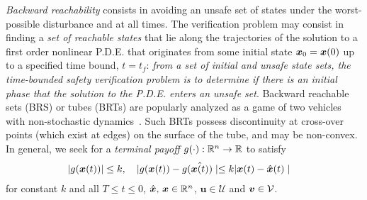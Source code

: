 \noindent   \textit{Backward reachability} consists in avoiding an unsafe set of states under the worst-possible disturbance and at all times. The verification problem may consist in finding a \textit{set of reachable states} that lie along the trajectories of the solution to a first order nonlinear P.D.E. that originates from some initial state $\bm{x}_0 = \bm{x}(0)$ up to a specified time bound, $t=t_f$: \textit{from a set of initial and unsafe state sets, the time-bounded safety verification problem is to determine if there is an initial phase that the solution to the P.D.E. enters an unsafe set}. Backward reachable sets (BRS) or tubes (BRTs) are popularly analyzed as a game of two vehicles with non-stochastic dynamics~\cite{Merz1972}. Such BRTs possess discontinuity at cross-over points (which exist at edges) on the surface of the  tube, and may be non-convex. In general, we seek for a \textit{terminal payoff} $g(\cdot): \mathbb{R}^n \rightarrow \mathbb{R}$ to satisfy
%
	\begin{align}
		| g(\bm{x}(t)) | &\le k, \quad | g(\bm{x}(t)) - g(\hat{\bm{x}(t)}) \mid \le k | \bm{x}(t) - \hat{\bm{x}}(t) \mid
	\end{align}
%
for constant $k$ and all $T \le t \le 0$, $\hat{\bm{x}}, \, \bm{x} \in \mathbb{R}^n$, $\bm{u}\in \mathcal{U}$ and $\bm{v} \in \mathcal{V}$.  %
%

